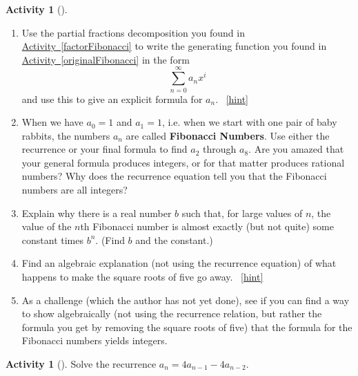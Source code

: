 \documentclass[10pt,]{book}
\newcommand{\terminology}[1]{\textbf{#1}}
\theoremstyle{plain}
\theoremstyle{definition}
\theoremstyle{definition}
\theoremstyle{definition}
\newtheorem{activity}[project]{Activity}
\numberwithin{equation}{chapter}
\begin{document}
\begin{activity}[]\label{solveFibonacci}
\leavevmode%
\begin{enumerate}[font=\bfseries,label=(\alph*),ref=\alph*]
\item\label{task-249} \hypertarget{p-1373}{}%
Use the partial fractions decomposition you found in \hyperref[factorFibonacci]{Activity~\ref{factorFibonacci}} to write the generating function you found in \hyperref[originalFibonacci]{Activity~\ref{originalFibonacci}} in the form%
\begin{equation*}
\sum_{n=0}^\infty a_nx^i
\end{equation*}
and use this to give an explicit formula for \(a_n\).%
~\hfill{\tiny\hyperlink{a-269.a}{[hint]}\hypertarget{q-269.a}{}}\item\label{task-250} \hypertarget{p-1376}{}%
When we have \(a_0=1\) and \(a_1=1\), i.e. when we start with one pair of baby rabbits, the numbers \(a_n\) are called \terminology{Fibonacci Numbers}.  Use either the recurrence or your final formula to find \(a_2\) through \(a_8\).  Are you amazed that your general formula produces integers, or for that matter produces rational numbers?  Why does the recurrence equation tell you that the Fibonacci numbers are all integers?%
\item\label{task-251} \hypertarget{p-1378}{}%
Explain why there is a real number \(b\) such that, for large values of \(n\), the value of the \(n\)th Fibonacci number is almost exactly (but not quite) some constant times \(b^n\). (Find \(b\) and the constant.)%
\item\label{task-252} \hypertarget{p-1380}{}%
Find an algebraic explanation (not using the recurrence equation) of what happens to make the square roots of five go away.%
~\hfill{\tiny\hyperlink{a-269.d}{[hint]}\hypertarget{q-269.d}{}}\item\label{task-253} \hypertarget{p-1383}{}%
As a challenge (which the author has not yet done), see if you can find a way to show algebraically (not using the recurrence relation, but rather the formula you get by removing the square roots of five) that the formula for the Fibonacci numbers yields integers.%
\end{enumerate}
\end{activity}
\begin{activity}[]\label{activity-263}
\hypertarget{p-1385}{}%
Solve the recurrence \(a_n= 4a_{n-1} - 4a_{n-2}\).%
\end{activity}
\typeout{************************************************}
\typeout{************************************************}
\end{document}
